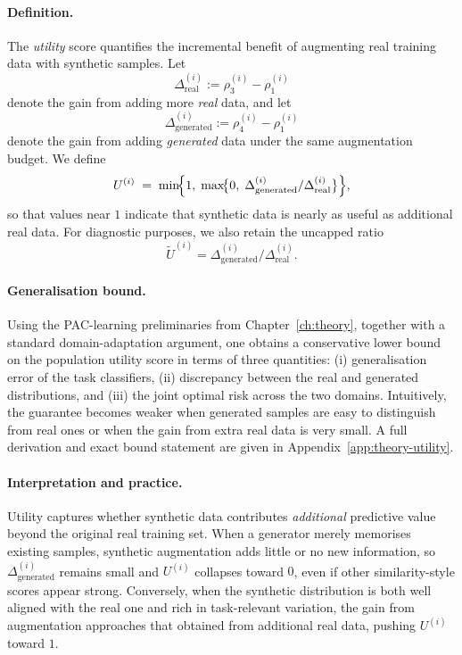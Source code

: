 \paragraph{Definition.}
The \emph{utility} score quantifies the incremental benefit of augmenting real
training data with synthetic samples. Let
\[
\Delta_{\mathrm{real}}^{(i)} := \rho_3^{(i)}-\rho_1^{(i)}
\]
denote the gain from adding more \emph{real} data, and let
\[
\Delta_{\mathrm{generated}}^{(i)} := \rho_4^{(i)}-\rho_1^{(i)}
\]
denote the gain from adding \emph{generated} data under the same augmentation
budget. We define
\[
U^{(i)} \;=\;
\min\!\Bigl\{1,\;\max\!\bigl\{0,\;
\Delta_{\mathrm{generated}}^{(i)} / \Delta_{\mathrm{real}}^{(i)}
\bigr\}\Bigr\},
\]
so that values near $1$ indicate that synthetic data is nearly as useful as
additional real data. For diagnostic purposes, we also retain the uncapped ratio
\[
\tilde U^{(i)}=
\Delta_{\mathrm{generated}}^{(i)} / \Delta_{\mathrm{real}}^{(i)}.
\]

\paragraph{Generalisation bound.}
Using the PAC-learning preliminaries from Chapter~\ref{ch:theory}, together
with a standard domain-adaptation argument, one obtains a conservative lower
bound on the population utility score in terms of three quantities: (i)
generalisation error of the task classifiers, (ii) discrepancy between the real
and generated distributions, and (iii) the joint optimal risk across the two
domains. Intuitively, the guarantee becomes weaker when generated samples are
easy to distinguish from real ones or when the gain from extra real data is very
small. A full derivation and exact bound statement are given in
Appendix~\ref{app:theory-utility}.

\paragraph{Interpretation and practice.}
Utility captures whether synthetic data contributes \emph{additional} predictive
value beyond the original real training set. When a generator merely memorises
existing samples, synthetic augmentation adds little or no new information, so
$\Delta_{\mathrm{generated}}^{(i)}$ remains small and $U^{(i)}$ collapses
toward $0$, even if other similarity-style scores appear strong. Conversely,
when the synthetic distribution is both well aligned with the real one and rich
in task-relevant variation, the gain from augmentation approaches that obtained
from additional real data, pushing $U^{(i)}$ toward $1$.

